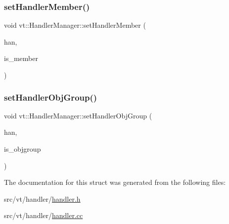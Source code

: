 \mbox{\label{structvt_1_1_handler_manager_aca4acd8d7a769a2226931ae1febe6379}} 
\subsubsection{\texorpdfstring{set\+Handler\+Member()}{setHandlerMember()}}
{\footnotesize\ttfamily void vt\+::\+Handler\+Manager\+::set\+Handler\+Member (\begin{DoxyParamCaption}\item[{\hyperlink{namespacevt_af64846b57dfcaf104da3ef6967917573}{Handler\+Type} \&}]{han,  }\item[{bool}]{is\+\_\+member }\end{DoxyParamCaption})\hspace{0.3cm}{\ttfamily [static]}}

\mbox{\label{structvt_1_1_handler_manager_a0822ddaf90168e28fc9974e7f672b529}} 
\subsubsection{\texorpdfstring{set\+Handler\+Obj\+Group()}{setHandlerObjGroup()}}
{\footnotesize\ttfamily void vt\+::\+Handler\+Manager\+::set\+Handler\+Obj\+Group (\begin{DoxyParamCaption}\item[{\hyperlink{namespacevt_af64846b57dfcaf104da3ef6967917573}{Handler\+Type} \&}]{han,  }\item[{bool}]{is\+\_\+objgroup }\end{DoxyParamCaption})\hspace{0.3cm}{\ttfamily [static]}}



The documentation for this struct was generated from the following files\+:\begin{DoxyCompactItemize}
\item 
src/vt/handler/\hyperlink{handler_8h}{handler.\+h}\item 
src/vt/handler/\hyperlink{handler_8cc}{handler.\+cc}\end{DoxyCompactItemize}
